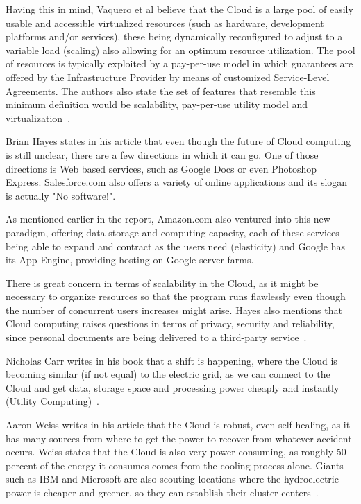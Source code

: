 Having this in mind, Vaquero et al believe that the Cloud is a large pool of easily usable and accessible virtualized resources (such as hardware, development platforms and/or services), these being dynamically reconfigured to adjust to a variable load (scaling) also allowing for an optimum resource utilization. The pool of resources is typically exploited by a pay-per-use model in which guarantees are offered by the Infrastructure Provider by means of customized Service-Level Agreements. The authors also state the set of features that resemble this minimum definition would be scalability, pay-per-use utility model and virtualization~\cite{vaquero}.

Brian Hayes states in his article that even though the future of Cloud computing is still unclear, there are a few directions in which it can go. One of those directions is Web based services, such as Google Docs or even Photoshop Express. Salesforce.com also offers a variety of online applications and its slogan is actually "No software!". 

As mentioned earlier in the report, Amazon.com also ventured into this new paradigm, offering data storage and computing capacity, each of these services being able to expand and contract as the users need (elasticity) and Google has its App Engine, providing hosting on Google server farms.

There is great concern in terms of scalability in the Cloud, as it might be necessary to organize resources so that the program runs flawlessly even though the number of concurrent users increases might arise. Hayes also mentions that Cloud computing raises questions in terms of privacy, security and reliability, since personal documents are being delivered to a third-party service~\cite{hayes}.

Nicholas Carr writes in his book that a shift is happening, where the Cloud is becoming similar (if not equal) to the electric grid, as we can connect to the Cloud and get data, storage space and processing power cheaply and instantly (Utility Computing)~\cite{carr}.

Aaron Weiss writes in his article that the Cloud is robust, even self-healing, as it has many sources from where to get the power to recover from whatever accident occurs. Weiss states that the Cloud is also very power consuming, as roughly 50 percent of the energy it consumes comes from the cooling process alone. Giants such as IBM and Microsoft are also scouting locations where the hydroelectric power is cheaper and greener, so they can establish their cluster centers~\cite{aaron-clouds}.

